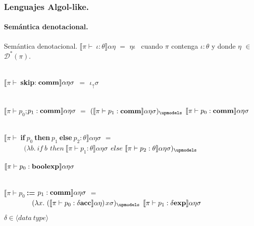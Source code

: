 \documentclass{beamer} %
\newcommand{\semBrcks}[1]{\llbracket #1 \rrbracket}
\newcommand{\angles}[1]{\langle #1 \rangle}
\newcommand{\D}{\mathcal{D}}
\newcommand{\deltaexp}{\delta \bf{exp}}
\newcommand{\boolexp}{\bf{boolexp}}
\newcommand{\deltaacc}{\delta \bf{acc}}
\newcommand{\comm}{\bf{comm}}
\newcommand{\cskip}{$\bf{skip}$}
\newcommand{\ifthenelse}[3]{\ $\bf{if}$ \ #1 \ $\bf{then}$ \ #2 \ $\bf{else}$ \ #3}
\newcommand{\assig}[2]{#1 \ ${\bf :=}$ \ #2}
\newcommand{\seq}[2]{#1 $;$ #2}
\newcommand{\denotalsem}[5]{\semBrcks{#1 \vdash #2} #3 #4 #5}
\newcommand{\iotabot}{\iota_{\uparrow}}
\begin{document}
\begin{frame}[shrink=1]
\frametitle{Lenguajes Algol-like.}
\framesubtitle{Sem\'antica denotacional.}

\begin{block}{Sem\'antica denotacional.} \small
$\semBrcks{\pi \vdash \ \iota:\theta}\alpha\eta$ $=$ $\eta\iota$ \ cuando $\pi$ contenga $\iota:\theta$ y donde $\eta$ $\in$ $\D^* (\pi)$.\\

\

$\denotalsem{\pi}{\ \cskip : \comm}{\alpha}{\eta}{\sigma}$ $=$ $\iotabot \sigma$\\

\

$\denotalsem{\pi}{ \seq{p_0}{p_1} : \comm}{\alpha}{\eta}{\sigma}$ $=$ 
$(\denotalsem{\pi}{p_1:\comm}{\alpha}{\eta}{\sigma})_{\upmodels}$ 
$\denotalsem{\pi}{p_0:\comm}{\alpha}{\eta}{\sigma}$\\

\

$\denotalsem{\pi}{\ifthenelse{p_0}{p_1}{p_2}:\theta}{\alpha}{\eta}{\sigma}$ $=$ \\
\ \ \ \ \ $(\lambda b . \ if \ b $
$then \ \denotalsem{\pi}{p_1:\theta}{\alpha}{\eta}{\sigma}$
$else \ \denotalsem{\pi}{p_2:\theta}{\alpha}{\eta}{\sigma})_{\upmodels}$ \\
\ \ \ \ \ \ \ \ \ \ \ \ \ \ \ \ \ \ \ \ \ \ \ \ \ \ \ \ \ \ \ \ \ \ \ \ \ \ \ \ \ \ \ \ \ \ \ \ \ \ \ \ \ \ \ \ 
$\denotalsem{\pi}{p_0:\boolexp}{\alpha}{\eta}{\sigma}$\\

\

$\denotalsem{\pi}{\assig{p_0}{p_1}:\comm}{\alpha}{\eta}{\sigma}$ $=$ \\
\ \ \ \ \ \ \ \ $(\lambda x. \ (\denotalsem{\pi}{p_0:\deltaacc}{\alpha}{\eta})$$x$${\sigma})_{\upmodels}$ 
$\denotalsem{\pi}{p_1:\deltaexp}{\alpha}{\eta}{\sigma}$ \\
\end{block}
$\delta \in \angles{data \ type}$
\end{frame}
\end{document}
